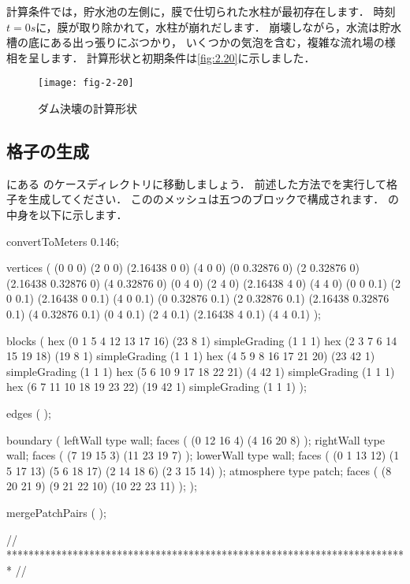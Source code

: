 計算条件では，貯水池の左側に，膜で仕切られた水柱が最初存在します．
時刻$t = 0\unit{s}$に，膜が取り除かれて，水柱が崩れだします．
崩壊しながら，水流は貯水槽の底にある出っ張りにぶつかり，
いくつかの気泡を含む，複雑な流れ場の様相を呈します．
計算形状と初期条件は\autoref{fig:2.20}に示しました．


\begin{figure}[ht]
 \texttt{[image: fig-2-20]}
 \caption{ダム決壊の計算形状}
 \label{fig:2.20}
\end{figure}


\subsection{格子の生成}
\label{ssec:2.3.1}
にある
のケースディレクトリに移動しましょう．
前述した方法でを実行して格子を生成してください．
こののメッシュは五つのブロックで構成されます．
の中身を以下に示します．
\begin{OFverbatim}[file, linenum=17]

convertToMeters 0.146;

vertices        
(
    (0 0 0)
    (2 0 0)
    (2.16438 0 0)
    (4 0 0)
    (0 0.32876 0)
    (2 0.32876 0)
    (2.16438 0.32876 0)
    (4 0.32876 0)
    (0 4 0)
    (2 4 0)
    (2.16438 4 0)
    (4 4 0)
    (0 0 0.1)
    (2 0 0.1)
    (2.16438 0 0.1)
    (4 0 0.1)
    (0 0.32876 0.1)
    (2 0.32876 0.1)
    (2.16438 0.32876 0.1)
    (4 0.32876 0.1)
    (0 4 0.1)
    (2 4 0.1)
    (2.16438 4 0.1)
    (4 4 0.1)
);

blocks          
(
    hex (0 1 5 4 12 13 17 16) (23 8 1) simpleGrading (1 1 1)
    hex (2 3 7 6 14 15 19 18) (19 8 1) simpleGrading (1 1 1)
    hex (4 5 9 8 16 17 21 20) (23 42 1) simpleGrading (1 1 1)
    hex (5 6 10 9 17 18 22 21) (4 42 1) simpleGrading (1 1 1)
    hex (6 7 11 10 18 19 23 22) (19 42 1) simpleGrading (1 1 1)
);

edges           
(
);

boundary
(
    leftWall
    {
        type wall;
        faces
        (
            (0 12 16 4)
            (4 16 20 8)
        );
    }
    rightWall
    {
        type wall;
        faces
        (
            (7 19 15 3)
            (11 23 19 7)
        );
    }
    lowerWall
    {
        type wall;
        faces
        (
            (0 1 13 12)
            (1 5 17 13)
            (5 6 18 17)
            (2 14 18 6)
            (2 3 15 14)
        );
    }
    atmosphere
    {
        type patch;
        faces
        (
            (8 20 21 9)
            (9 21 22 10)
            (10 22 23 11)
        );
    }
);

mergePatchPairs
(
);

// ************************************************************************* //
\end{OFverbatim}


